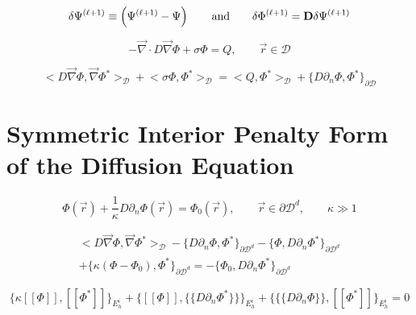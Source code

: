 \begin{equation}
\label{}
\delta \Psi^{(\ell+1)} \equiv \left( \Psi^{(\ell+1)} - \Psi \right) \qquad \text{and} \qquad \delta \Phi^{(\ell+1)} = {\bf D}  \delta \Psi^{(\ell+1)}
\end{equation}

\begin{equation}
\label{eq::simple_diffusion_equation}
-\vec{\nabla} \cdot D \vec{\nabla} \Phi + \sigma \Phi = Q, \qquad \vec{r} \in \mathcal{D}
\end{equation}

\begin{equation}
\label{eq::diffusion_weak_form}
\Big< D \vec{\nabla} \Phi, \vec{\nabla} \Phi^* \Big>_{\mathcal{D}} + \Big<  \sigma   \Phi ,  \Phi^*  \Big>_{\mathcal{D}} = \Big<  Q, \Phi^*  \Big>_{\mathcal{D}} + \Big\{ D \partial_n \Phi,  \Phi^* \Big\}_{\partial \mathcal{D}}
\end{equation}

\section{Symmetric Interior Penalty Form of the Diffusion Equation}
\label{sec::DSA_SIP}

\begin{equation}
\label{eq::penalty_boundary_term}
\Phi (\vec{r}) +\frac{1}{\kappa} D \partial_n \Phi (\vec{r}) = \Phi_0 (\vec{r}), \qquad \vec{r} \in \partial \mathcal{D}^d, \qquad \kappa \gg 1
\end{equation}

\begin{equation}
\label{eq::SIP_boundary_laplacian_term}
\begin{aligned}
\Big<  D \vec{\nabla}  \Phi , \vec{\nabla} \Phi^*  \Big>_{\mathcal{D}} - \Big\{   D \partial_n \Phi, \Phi^* \Big\}_{\partial \mathcal{D}^d} - \Big\{  \Phi, D \partial_n \Phi^* \Big\}_{\partial \mathcal{D}^d} \\ + \Big\{ \kappa (\Phi - \Phi_0),  \Phi^* \Big\}_{\partial \mathcal{D}^d} = - \Big\{  \Phi_0, D \partial_n \Phi^* \Big\}_{\partial \mathcal{D}^d} 
\end{aligned}
\end{equation}

\begin{equation}
\label{eq::SIP_interior_laplacian_term}
\Big\{ \kappa [\![   \Phi ]\!] , [\![  \Phi^* ]\!]\Big\}_{E_h^i} + \Big\{  [\![   \Phi ]\!] , \{\!\{  D \partial_n \Phi^* \}\!\}\Big\}_{E_h^i} + \Big\{ \{\!\{  D \partial_n  \Phi \}\!\} , [\![  \Phi^* ]\!]\Big\}_{E_h^i} = 0
\end{equation}

